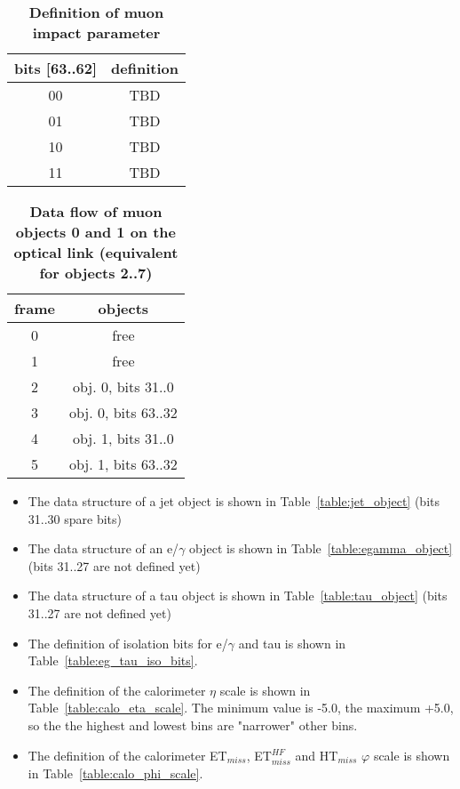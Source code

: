 \documentclass{cmspaper}
\begin{document}
\begin{table}[ht]
\caption{\bf Definition of muon impact parameter}
\vspace{5mm}
\centering
\begin{tabular}{|c|c|}\hline
bits [63..62] & definition \\\hline\hline
00 & TBD \\
01 & TBD \\
10 & TBD \\
11 & TBD \\\hline
\end{tabular}
\label{table:muon_iso_bits}
\end{table}

\begin{table}[ht]
\caption{\bf Data flow of muon objects 0 and 1 on the optical link \rm(equivalent for objects 2..7)}
\vspace{5mm}
\centering
\begin{tabular}{|c|c|}\hline
frame & objects\\\hline\hline
0 & free \\\hline
1 & free \\\hline
2 & obj. 0, bits 31..0\\\hline
3 & obj. 0, bits 63..32 \\\hline
4 & obj. 1, bits 31..0 \\\hline
5 & obj. 1, bits 63..32 \\\hline
\end{tabular}
\label{table:opt_link_muon_obj_0_1}
\end{table}

\clearpage

\begin{itemize}
\item The data structure of a jet object is shown in Table~\ref{table:jet_object} (bits 31..30 spare bits)
\item The data structure of an e/$\gamma$ object is shown in Table~\ref{table:egamma_object} (bits 31..27 are not defined yet)
\item The data structure of a tau object is shown in Table~\ref{table:tau_object} (bits 31..27 are not defined yet)
\item The definition of isolation bits for e/$\gamma$ and tau is shown in Table~\ref{table:eg_tau_iso_bits}.
\item The definition of the calorimeter $\eta$ scale is shown in Table~\ref{table:calo_eta_scale}. The minimum value is -5.0, the maximum +5.0, so the the highest and lowest
bins are "narrower" other bins.
\item The definition of the calorimeter ET$_{miss}$, ET$_{miss}^{HF}$ and HT$_{miss}$ $\varphi$ scale is shown in Table~\ref{table:calo_phi_scale}.
\end{itemize}
\end{document}
